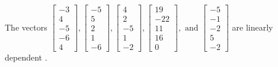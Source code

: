 \begin{exercise}
\begin{exerciseStatement}
  \end{exerciseStatement}
  \begin{exerciseAnswer}
   The vectors \(\left[\begin{array}{r}
-3 \\
4 \\
-5 \\
-6 \\
4
\end{array}\right] , \left[\begin{array}{r}
-5 \\
5 \\
2 \\
1 \\
-6
\end{array}\right] , \left[\begin{array}{r}
4 \\
2 \\
-5 \\
1 \\
-2
\end{array}\right] , \left[\begin{array}{r}
19 \\
-22 \\
11 \\
16 \\
0
\end{array}\right] , \text{ and } \left[\begin{array}{r}
-5 \\
-1 \\
-2 \\
5 \\
-2
\end{array}\right]\) are 
  	 linearly dependent  .
  


  \end{exerciseAnswer}
\end{exercise}